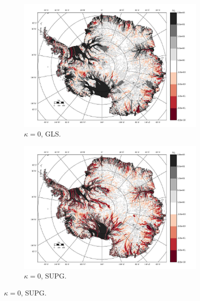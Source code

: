 \begin{figure}
  \label{antarctica_bv_image_misfit}

\end{figure}


\begin{figure}

  \centering

  \begin{subfigure}[b]{0.45\linewidth}
    \includegraphics[width=\linewidth]{images/balance_velocity/antarctica/d_U_ob_S/misfit_10H_kappa_0_GLS.jpg}
  \caption{$\kappa = 0$, GLS.}
  \label{antarctica_bv_image_kappa_0_GLS_U_ob_S_misfit}
  \end{subfigure}
  \begin{subfigure}[b]{0.45\linewidth}
    \includegraphics[width=\linewidth]{images/balance_velocity/antarctica/d_U_ob_S/misfit_10H_kappa_0_SUPG.jpg}
  \caption{$\kappa = 0$, SUPG.}
  \label{antarctica_bv_image_kappa_0_SUPG_U_ob_S_misfit}
  \end{subfigure}


\end{figure}
